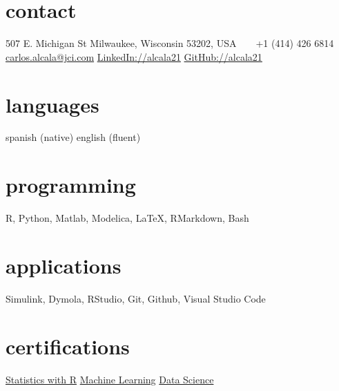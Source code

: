 \documentclass[]{friggeri-cv} %
\begin{document}


\begin{aside} %
\section{contact}
507 E. Michigan St
Milwaukee, Wisconsin 53202, USA
~
\Mobilefone~ +1 (414) 426 6814
~
\href{mailto:carlos.alcala@jci.com}{carlos.alcala@jci.com}
\href{https://www.linkedin.com/in/alcala21}{LinkedIn://alcala21}
\href{https://www.github.com/alcala21}{GitHub://alcala21}
\section{languages}
spanish (native)
english (fluent)
\section{programming}
R, Python, Matlab,
Modelica, \LaTeX, 
RMarkdown, Bash
\section{applications}
Simulink, Dymola,
RStudio, Git, Github,
Visual Studio Code
\section{certifications}
\href{https://www.coursera.org/account/accomplishments/specialization/certificate/UWG3PS5EXMBJ}{Statistics with R}
\href{https://www.coursera.org/account/accomplishments/specialization/certificate/2VHFDHW5GUK6}{Machine Learning}
\href{https://www.coursera.org/account/accomplishments/specialization/certificate/W9DB45S3CGDZ}{Data Science}
\end{aside}

\end{document}
